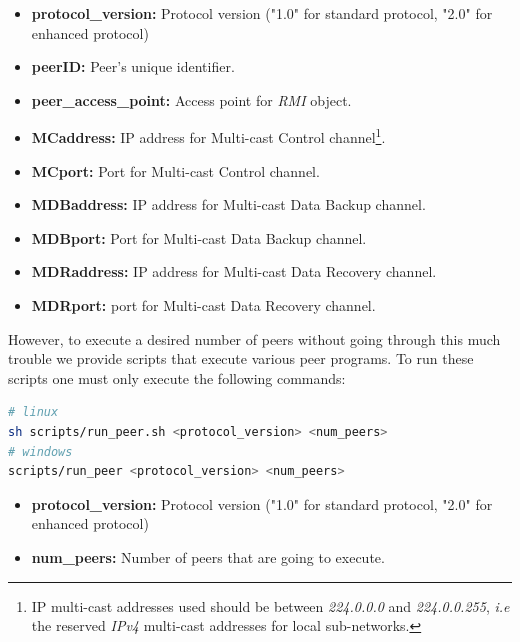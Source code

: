 \documentclass[a4paper]{article}
\begin{document}
            \begin{itemize}
                \item \textbf{protocol\_version:} Protocol version ("1.0" for standard protocol, "2.0" for enhanced protocol)
              
                \item \textbf{peerID:} Peer's unique identifier.
                
                \item \textbf{peer\_access\_point:} Access point for \textit{RMI} object.
                
                \item \textbf{MCaddress:} IP address for Multi-cast Control channel\footnote{IP multi-cast addresses used should be between \textit{224.0.0.0} and \textit{224.0.0.255}, \textit{i.e} the reserved \textit{IPv4} multi-cast addresses for local sub-networks.}.
                
                \item \textbf{MCport:} Port for Multi-cast Control channel.
                
                \item \textbf{MDBaddress:} IP address for Multi-cast Data Backup channel.
                
                \item \textbf{MDBport:} Port for Multi-cast Data Backup channel.
                
                \item \textbf{MDRaddress:} IP address for Multi-cast Data Recovery channel.
                
                \item \textbf{MDRport:} port for Multi-cast Data Recovery channel.
            \end{itemize}
            
            However, to execute a desired number of peers without going through this much trouble we provide scripts that execute various peer programs. To run these scripts one must only execute the following commands:
        
\begin{lstlisting}[language=Bash, caption=Executing \textit{Peer} Program Scripts]
# linux
sh scripts/run_peer.sh <protocol_version> <num_peers>
# windows
scripts/run_peer <protocol_version> <num_peers>
\end{lstlisting}

            \begin{itemize}
                \item \textbf{protocol\_version:} Protocol version ("1.0" for standard protocol, "2.0" for enhanced protocol)
              
                \item \textbf{num\_peers:} Number of peers that are going to execute.
            \end{itemize}
            
\end{document}
